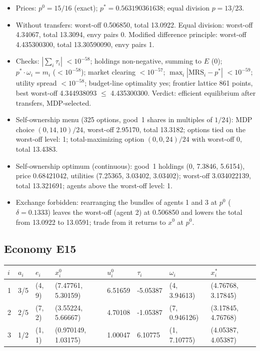 \begin{itemize}[leftmargin=1.2em,itemsep=0pt,topsep=2pt]\footnotesize
\item Prices: $p^0 = 15/16$ (exact); $p^* = 0.563190361638$; equal division $p = 13/23$.
\item Without transfers: worst-off 0.506850, total 13.0922. Equal division: worst-off 4.34067, total 13.3094, envy pairs 0. Modified difference principle: worst-off 4.435300300, total 13.30590090, envy pairs 1.
\item Checks: $|\sum_i\tau_i|$ $<10^{-58}$; holdings non-negative, summing to $E$ (0); $p^*\cdot\omega_i = m_i$ ($<10^{-58}$); market clearing $<10^{-57}$; $\max_i|\mathrm{MRS}_i - p^*|$ $<10^{-59}$; utility spread $<10^{-58}$; budget-line optimality yes; frontier lattice 861 points, best worst-off 4.344938093 $\leq$ 4.435300300. Verdict: efficient equilibrium after transfers, MDP-selected.
\item Self-ownership menu (325 options, good~1 shares in multiples of $1/24$): MDP choice $(0, 14, 10)/24$, worst-off 2.95170, total 13.3182; options tied on the worst-off level: 1; total-maximizing option $(0, 0, 24)/24$ with worst-off 0, total 13.4383.
\item Self-ownership optimum (continuous): good~1 holdings (0, 7.3846, 5.6154), price 0.68421042, utilities (7.25365, 3.03402, 3.03402); worst-off 3.034022139, total 13.321691; agents above the worst-off level: 1.
\item Exchange forbidden: rearranging the bundles of agents 1 and 3 at $p^0$ ($\delta = 0.1333$) leaves the worst-off (agent 2) at 0.506850 and lowers the total from 13.0922 to 13.0591; trade from it returns to $x^0$ at $p^0$.
\end{itemize}

\subsection*{Economy E15}
\label{ec:E15}
{\scriptsize\setlength{\tabcolsep}{3pt}
\begin{tabular}{@{}llllllll@{}}
\toprule
$i$ & $a_i$ & $e_i$ & $x^0_i$ & $u^0_i$ & $\tau_i$ & $\omega_i$ & $x^*_i$ \\
\midrule
1 & 3/5 & (4, 9) & (7.47761, 5.30159) & 6.51659 & -5.05387 & (4, 3.94613) & (4.76768, 3.17845) \\
2 & 2/5 & (7, 2) & (3.55224, 5.66667) & 4.70108 & -1.05387 & (7, 0.946126) & (3.17845, 4.76768) \\
3 & 1/2 & (1, 1) & (0.970149, 1.03175) & 1.00047 & 6.10775 & (1, 7.10775) & (4.05387, 4.05387) \\
\bottomrule\end{tabular}}

